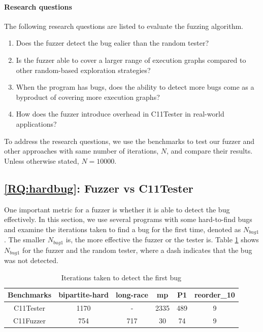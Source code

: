 \paragraph*{Research questions} The following research questions are listed to evaluate the fuzzing algorithm.
\begin{enumerate}[label=RQ\arabic*]
	\item Does the fuzzer detect the bug ealier than the random tester? \label{RQ:hardbug}
	\item Is the fuzzer able to cover a larger range of execution graphs compared to other random-based exploration strategies? \label{RQ:coverage}
	\item When the program has bugs, does the ability to detect more bugs come as a byproduct of covering more execution graphs? \label{RQ:bug}
	\item How does the fuzzer introduce overhead in C11Tester in real-world applications? \label{RQ:overhead}
\end{enumerate}

To address the research questions, we use the benchmarks to test our fuzzer and other approaches with same number of iterations, $N$, and compare their results. Unless otherwise stated, $N = 10000$.

\subsection{\ref*{RQ:hardbug}: Fuzzer vs C11Tester}

One important metric for a fuzzer is whether it is able to detect the bug effectively. In this section, we use several programs with some hard-to-find bugs and examine the iterations taken to find a bug for the first time, denoted as $N_{bug1}$. The smaller $N_{bug1}$ is, the more effective the fuzzer or the tester is. Table \ref{c11fuzzer-hardbug} shows $N_{bug1}$ for the fuzzer and the random tester, where a dash indicates that the bug was not detected.
\begin{table}[h!]
	\centering
	\begin{tabular}{ |c|ccccc| }
		\hline
		Benchmarks & bipartite-hard & long-race & mp & P1  & reorder\_10 \\
		\hline
		C11Tester  & 1170           & -         & 2335  & 489 & 9           \\
		C11Fuzzer  & 754            & 717       & 30 & 74  & 9           \\
		\hline
	\end{tabular}
	\caption{Iterations taken to detect the first bug}
	\label{c11fuzzer-hardbug}
\end{table}


